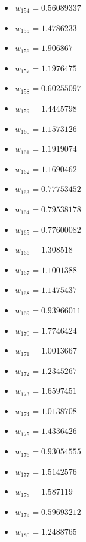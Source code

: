 \documentclass[11pt]{article}
\begin{document}
\begin{itemize}
\item $w_{154} = 0.56089337$
\item $w_{155} = 1.4786233$
\item $w_{156} = 1.906867$
\item $w_{157} = 1.1976475$
\item $w_{158} = 0.60255097$
\item $w_{159} = 1.4445798$
\item $w_{160} = 1.1573126$
\item $w_{161} = 1.1919074$
\item $w_{162} = 1.1690462$
\item $w_{163} = 0.77753452$
\item $w_{164} = 0.79538178$
\item $w_{165} = 0.77600082$
\item $w_{166} = 1.308518$
\item $w_{167} = 1.1001388$
\item $w_{168} = 1.1475437$
\item $w_{169} = 0.93966011$
\item $w_{170} = 1.7746424$
\item $w_{171} = 1.0013667$
\item $w_{172} = 1.2345267$
\item $w_{173} = 1.6597451$
\item $w_{174} = 1.0138708$
\item $w_{175} = 1.4336426$
\item $w_{176} = 0.93054555$
\item $w_{177} = 1.5142576$
\item $w_{178} = 1.587119$
\item $w_{179} = 0.59693212$
\item $w_{180} = 1.2488765$
\end{itemize}
\end{document}
